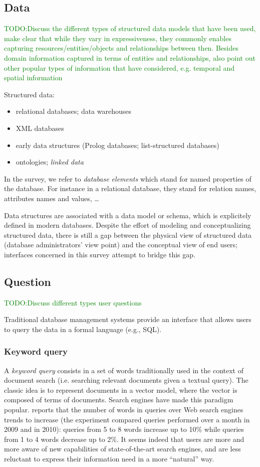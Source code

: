 \documentclass[10pt,journal,letterpaper,compsoc]{IEEEtran}
\newcommand{\TODO}[1]{{\textcolor{green}{TODO:#1}}}
\begin{document}
\subsection{Data}
\label{sec:data}
\TODO{Discuss the different types of structured data models that have been used, make clear that while they vary in expressiveness, they commonly enables capturing resources/entities/objects and relationships between then. Besides domain information captured in terms of entities and relationships, also point out other popular types of information that have considered, e.g. temporal and spatial information}

Structured data:
\begin{itemize}
  \item relational databases; data warehouses
  \item XML databases
  \item early data structures (Prolog databases; list-structured databases)
  \item ontologies; {\it linked data}
\end{itemize}
In the survey, we refer to {\it database elements} which stand for named
properties of the database. For instance in a relational database, they stand
for relation names, attributes names and values, \ldots

Data structures are associated with a data model or schema, which is explicitely
defined in modern databases.
Despite the effort of modeling and conceptualizing structured data, there is
still a gap between the physical view of structured data (database
administrators' view point) and the conceptual view of end users; interfaces
concerned in this survey attempt to bridge this gap. 



\subsection{Question}
\TODO{Discuss different types user questions}

\label{sec:big-picture-question}
Traditional database management systems provide an interface that allows users
to query the data in a formal language (e.g., SQL).
\subsubsection{Keyword query}
A {\it keyword query} consists in a set of words
traditionally used in the context of document search (i.e. searching relevant
documents given a textual query).
The classic idea is to represent documents in a vector model, where the vector
is composed of terms of documents. Search engines have made this paradigm
popular.
\cite{Hearst:2011:NSU:2018396.2018414} reports that the number of words
in queries over Web search engines trends to increase (the experiment compared
queries performed over a month in 2009 and in 2010): queries from 5 to 8 words
increase up to 10\% while queries from 1 to 4 words decrease up to 2\%.
It seems indeed that users are more and more aware of new capabilities of
state-of-the-art search engines, and are less reluctant to express their
information need in a more ``natural'' way.
\end{document}

